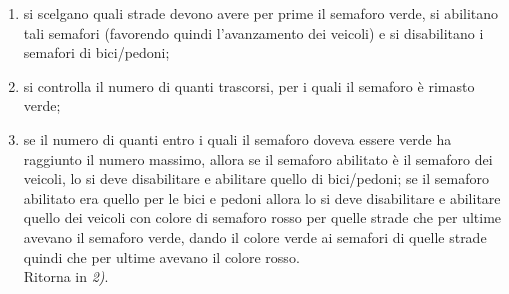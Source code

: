 \begin{enumerate}
\item si scelgano quali strade devono avere per prime il semaforo verde, si  abilitano tali semafori (favorendo quindi l'avanzamento dei veicoli) e si disabilitano i semafori di bici/pedoni;
\item si controlla il numero di quanti trascorsi, per i quali il semaforo è rimasto verde;
\item se il numero di quanti entro i quali il semaforo doveva essere verde ha raggiunto il numero massimo, allora se il semaforo abilitato è il semaforo dei veicoli, lo si deve disabilitare e abilitare quello di bici/pedoni; se il semaforo abilitato era quello per le bici e pedoni allora lo si deve disabilitare e abilitare quello dei veicoli con colore di semaforo rosso per quelle strade che per ultime avevano il semaforo verde, dando il colore verde ai semafori di quelle strade quindi che per ultime avevano il colore rosso.\\ Ritorna in \textit{2)}.
\end{enumerate}
 